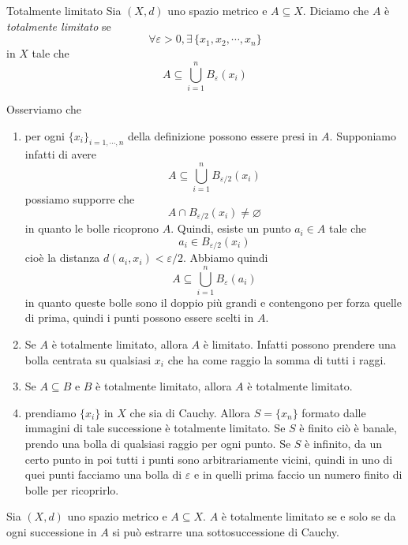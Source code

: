 \documentclass[a4paper]{article}
\begin{document}
\begin{snippetdefinition}{Totalmente limitato}
    Sia \((X, d)\) uno spazio metrico e \(A \subseteq X\).
    Diciamo che \(A\) è \emph{totalmente limitato} se
    \[
        \forall \varepsilon > 0, \exists\,\{x_1, x_2, \cdots, x_n\}
    \]
    in \(X\) tale che
    \[
        A \subseteq \bigcup_{i=1}^n B_\varepsilon(x_i)
    \]
\end{snippetdefinition}

Osserviamo che
\begin{enumerate}
    \item per ogni \(\{x_i\}_{i=1,\cdots, n}\) della definizione possono essere presi in \(A\).
    Supponiamo infatti di avere
    \[
        A \subseteq \bigcup_{i=1}^n B_{\varepsilon/2}(x_i)
    \]
    possiamo supporre che
    \[
        A \cap B_{\varepsilon/2}(x_i) \neq \varnothing
    \]
    in quanto le bolle ricoprono \(A\).
    Quindi, esiste un punto \(a_i \in A\) tale che
    \[
        a_i \in B_{\varepsilon/2}(x_i)
    \]
    cioè la distanza \(d(a_i, x_i) < \varepsilon/2\). Abbiamo quindi
    \[
        A \subseteq \bigcup_{i=1}^n B_{\varepsilon}(a_i)
    \]
    in quanto queste bolle sono il doppio più grandi e contengono per forza quelle di prima,
    quindi i punti possono essere scelti in \(A\).
    \item Se \(A\) è totalmente limitato, allora \(A\) è limitato.
    Infatti possono prendere una bolla centrata su qualsiasi \(x_i\) che ha come raggio la somma di tutti i raggi.
    \item Se \(A \subseteq B\) e \(B\) è totalmente limitato, allora \(A\) è totalmente limitato.
    \item prendiamo \(\{x_i\}\) in \(X\) che sia di Cauchy.
    Allora \(S = \{x_n\}\) formato dalle immagini di tale successione è totalmente limitato.
    Se \(S\) è finito ciò è banale, prendo una bolla di qualsiasi raggio per ogni punto.
    Se \(S\) è infinito, da un certo punto in poi tutti i punti sono arbitrariamente vicini, quindi in uno di quei punti
    facciamo una bolla di \(\varepsilon\) e in quelli prima faccio un numero finito di bolle per ricoprirlo.
\end{enumerate}

\begin{snippettheorem}{}
    Sia \((X, d)\) uno spazio metrico e \(A \subseteq X\).
    \(A\) è totalmente limitato se e solo se da ogni successione in \(A\)
    si può estrarre una sottosuccessione di Cauchy.
\end{snippettheorem}
\end{document}

